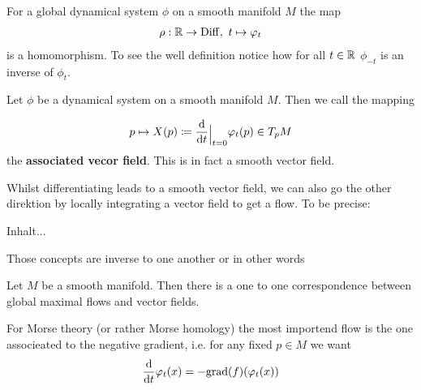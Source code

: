 \begin{corollary}
	For a global dynamical system $\phi$ on a smooth manifold $M$ the map
	\begin{align*}
		\rho: \mathbb{R} \to \operatorname{\mathrm{Diff}},~t\mapsto \varphi_t
	\end{align*}is a homomorphism. To see the well definition notice how for all $t\in \mathbb{R}$ $\phi_{-t}$ is an inverse of $\phi_t$.
\end{corollary}
\begin{definition}
Let $\phi$ be a dynamical system on a smooth manifold $M$. Then we call the mapping

\begin{align*}
	p\mapsto X(p)\coloneq \frac{\diff }{\diff t}\einsch{t=0}\phi_t(p)\in T_pM
\end{align*} the \textbf{associated vecor field}. This is in fact a smooth vector field. 
\end{definition}
Whilst differentiating leads to a smooth vector field, we can also go the other direktion by locally integrating a vector field to get a flow. To be precise:
\begin{definition}
	Inhalt...
\end{definition}
Those concepts are inverse to one another or in other words
\begin{theorem}
	Let $M$ be a smooth manifold. Then there is a one to one correspondence between global maximal flows and vector fields.
\end{theorem}
\begin{definition}
For Morse theory (or rather Morse homology) the most importend flow is the one associeated to the negative gradient, i.e. for any fixed $p\in M$ we want
\begin{align*}
	\frac{\mathop{}\!\mathrm{d} }{\mathop{}\!\mathrm{d} t}\varphi_t(x)=-\mathrm{grad}(f)(\varphi_t(x))
\end{align*}
\end{definition}
